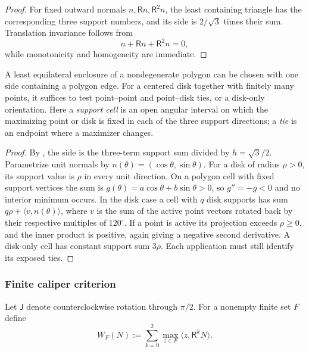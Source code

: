 \begin{proof}
For fixed outward normals $n,\mathsf Rn,\mathsf R^2n$, the least containing
triangle has the corresponding three support numbers, and its side is
$2/\sqrt3$ times their sum.  Translation invariance follows from
\[
 n+\mathsf Rn+\mathsf R^2n=0,
\]
while monotonicity and homogeneity are immediate.
\end{proof}

\begin{lemma}
\label{lem:support-cell-rotation}
A least equilateral enclosure of a nondegenerate polygon can be chosen
with one side containing a polygon edge. For a centered disk together
with finitely many points, it suffices to test point--point and point--disk
ties, or a disk-only orientation. Here a \emph{support cell} is an open
angular interval on which the maximizing point or disk is fixed in each
of the three support directions; a \emph{tie} is an endpoint where a
maximizer changes.
\end{lemma}
\begin{proof}
By , the side is the three-term support
sum divided by $h=\sqrt3/2$. Parametrize unit normals by
$n(\theta)=(\cos\theta,\sin\theta)$. For a disk of radius $\rho>0$, its
support value is $\rho$ in every unit direction. On a polygon cell with fixed support vertices the sum
is $g(\theta)=a\cos\theta+b\sin\theta>0$, so $g''=-g<0$ and no
interior minimum occurs. In the disk case a cell with $q$ disk supports
has sum $q\rho+\langle v,n(\theta)\rangle$, where $v$ is the sum
of the active point vectors rotated back by their respective multiples
of $120^\circ$. If a point is active its
projection exceeds $\rho\ge0$, and the inner product is positive, again
giving a negative second derivative. A disk-only cell has constant support sum $3\rho$. Each application must still identify its exposed ties.
\end{proof}

\subsubsection{Finite caliper criterion}
\label{subsec:finite-caliper}

Let $\mathsf J$ denote counterclockwise rotation through $\pi/2$.  For a
nonempty finite set $F$ define
\begin{equation}
 W_F(N):=\sum_{k=0}^2\max_{z\in F}
 \langle z,\mathsf R^kN\rangle.
 \label{eq:caliper-support-sum}
\end{equation}

